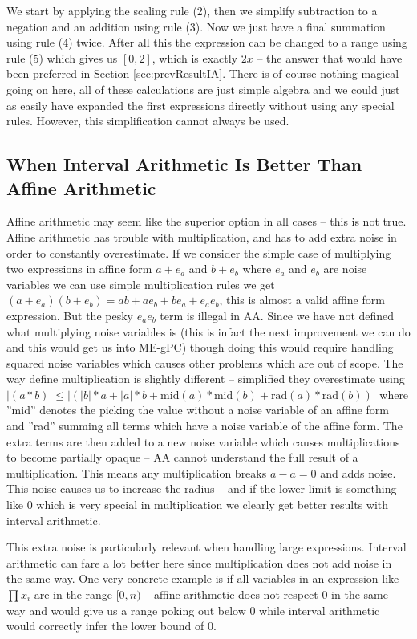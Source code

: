 We start by applying the scaling rule (2), then we simplify subtraction to a negation and an addition using rule (3). Now we just have a final summation using rule (4) twice. After all this the expression can be changed to a range using rule (5) which gives us $[0, 2]$, which is exactly $2x$ -- the answer that would have been preferred in Section \ref{sec:prevResultIA}. There is of course nothing magical going on here, all of these calculations are just simple algebra and we could just as easily have expanded the first expressions directly without using any special rules. However, this simplification cannot always be used. 

\subsection{When Interval Arithmetic Is Better Than Affine Arithmetic}
Affine arithmetic may seem like the superior option in all cases -- this is not true. Affine arithmetic has trouble with multiplication, and has to add extra noise in order to constantly overestimate. If we consider the simple case of multiplying two expressions in affine form $a + e_a$ and $b + e_b$ where $e_a$ and $e_b$ are noise variables we can use simple multiplication rules we get $(a + e_a)(b + e_b) = ab + ae_b + be_a + e_ae_b$, this is almost a valid affine form expression. But the pesky $e_ae_b$ term is illegal in AA. Since we have not defined what multiplying noise variables is (this is infact the next improvement we can do and this would get us into ME-gPC) though doing this would require handling squared noise variables which causes other problems which are out of scope. The way \cite{src:affAri} define multiplication is slightly different -- simplified they overestimate using $|(a * b)| \leq |(|b| * a + |a| * b + \text{mid}(a) * \text{mid}(b) + \text{rad}(a) * \text{rad}(b))|$ where ''mid'' denotes the picking the value without a noise variable of an affine form and ''rad'' summing all terms which have a noise variable of the affine form. The extra terms are then added to a new noise variable which causes multiplications to become partially opaque -- AA cannot understand the full result of a multiplication. This means any multiplication breaks $a - a = 0$ and adds noise. This noise causes us to increase the radius -- and if the lower limit is something like $0$ which is very special in multiplication we clearly get better results with interval arithmetic.

This extra noise is particularly relevant when handling large expressions. Interval arithmetic can fare a lot better here since multiplication does not add noise in the same way. One very concrete example is if all variables in an expression like $\prod x_i$ are in the range $[0,n)$ -- affine arithmetic does not respect $0$ in the same way and would give us a range poking out below $0$ while interval arithmetic would correctly infer the lower bound of $0$.

